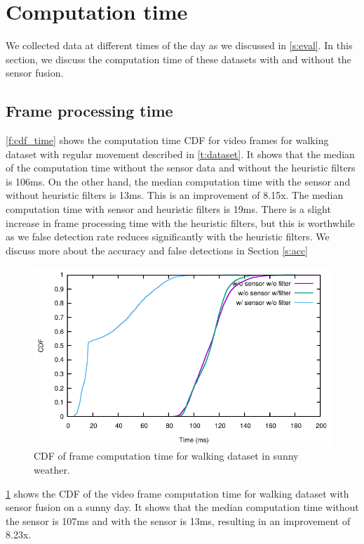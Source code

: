 \section{Computation time}
We collected data at different times of the day as we discussed in \ref{s:eval}.
In this section, we discuss the computation time of these datasets with and without the sensor fusion.

\subsection{Frame processing time}
\ref{f:cdf_time} shows the computation time CDF for video frames for walking dataset with regular movement described in \ref{t:dataset}.
It shows that the median of the computation time without the sensor data and without the heuristic filters is 106ms.
On the other hand, the median computation time with the sensor and without heuristic filters is 13ms.
This is an improvement of 8.15x.
The median computation time with sensor and heuristic filters is 19ms.
There is a slight increase in frame processing time with the heuristic filters, but this is worthwhile as we false detection rate reduces significantly with the heuristic filters.  
We discuss more about the accuracy and false detections in Section \ref{s:acc}

\begin{figure}[h!]
\centering
\includegraphics[width=5.2in]{plots/sunny_cdf_time.pdf}
\caption{CDF of frame computation time for walking dataset in sunny weather.}
\label{f:cdf_sunny}
\end{figure}

\ref{f:cdf_sunny} shows the CDF of the video frame computation time for walking dataset with sensor fusion on a sunny day.
It shows that the median computation time without the sensor is 107ms and with the sensor is 13ms, resulting in an improvement of 8.23x.


